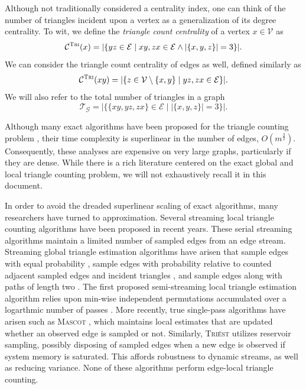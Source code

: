 \documentclass[10]{article}
\newcommand{\algoname}[1]{\textnormal{\textsc{#1}}}
\begin{document}
Although not traditionally considered a centrality index, one can think of the number of triangles incident upon a vertex as a generalization of its degree centrality. 
To wit, we define the \emph{triangle count centrality} of a vertex $x \in \mathcal{V}$ as
%
\begin{equation}
	\mathcal{C}^{\algoname{Tri}}(x) = |\{yz \in \mathcal{E} \mid xy, zx \in \mathcal{E} \wedge |\{x, y, z\}| = 3\}|.
\end{equation}
%
We can consider the triangle count centrality of edges as well, defined similarly as
%
\begin{equation}
	\mathcal{C}^{\algoname{Tri}}(xy) = |\{z \in \mathcal{V} \setminus \{x,y\} \mid yz, zx \in \mathcal{E}\}|.
\end{equation}
%
We will also refer to the total number of triangles in a graph 
%
\begin{equation}
	\mathcal{T}_\mathcal{G} = |\{ \{xy, yz, zx\} \in \mathcal{E} \mid |\{x, y, z\}| = 3 \} |.
\end{equation}
%

Although many exact algorithms have been proposed for the triangle counting problem \cite{tsourakakis2008fast, becchetti2010efficient, chu2011triangle, suri2011counting, wolf2017fast}, their time complexity is superlinear in the number of edges, $O(m^{
\frac{3}{2}})$.
Consequently, these analyses are expensive on very large graphs, particularly if they are dense.
While there is a rich literature centered on the exact global and local triangle counting problem, we will not exhaustively recall it in this document.

In order to avoid the dreaded superlinear scaling of exact algorithms, many researchers have turned to approximation.
Several streaming local triangle counting algorithms have been proposed in recent years.
These serial streaming algorithms  maintain a limited number of sampled edges from an edge stream.
Streaming global triangle estimation algorithms have arisen that sample edges with equal probability \cite{tsourakakis2009doulion}, sample edges with probability relative to counted adjacent sampled edges and incident triangles \cite{ahmed2017sampling}, and sample edges along with paths of length two \cite{jha2013space}. 
The first proposed semi-streaming local triangle estimation algorithm relies upon min-wise independent permutations accumulated over a logarthmic number of passes \cite{becchetti2008efficient}. 
More recently, true single-pass algorithms have arisen such as \algoname{Mascot} \cite{lim2015mascot}, which maintains local estimates that are updated whether an observed edge is sampled or not.
Similarly, \algoname{Tri\'est} \cite{stefani2017triest} utilizes reservoir sampling, possibly disposing of sampled edges when a new edge is observed if system memory is saturated.
This affords robustness to dynamic streams, as well as reducing variance.
None of these algorithms perform edge-local triangle counting.
\end{document}
